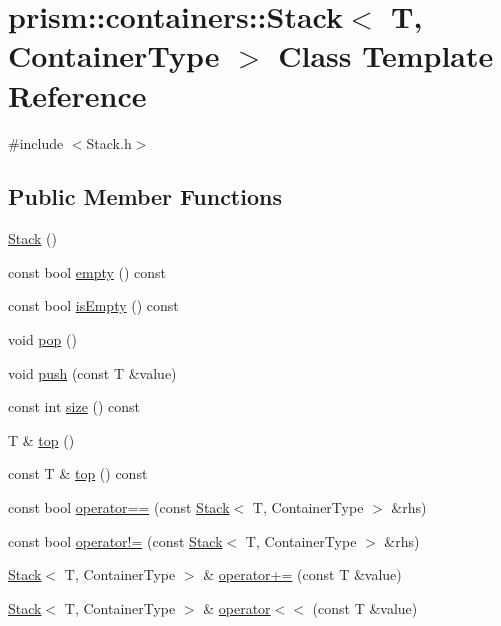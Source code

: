 \hypertarget{classprism_1_1containers_1_1_stack}{}\section{prism\+:\+:containers\+:\+:Stack$<$ T, Container\+Type $>$ Class Template Reference}
\label{classprism_1_1containers_1_1_stack}


{\ttfamily \#include $<$Stack.\+h$>$}

\subsection*{Public Member Functions}
\begin{DoxyCompactItemize}
\item 
\hyperlink{classprism_1_1containers_1_1_stack_a4043720d923c57d4efc3581e5a8043df}{Stack} ()
\item 
const bool \hyperlink{classprism_1_1containers_1_1_stack_af2f1920726e21c2c14b41808767887d6}{empty} () const 
\item 
const bool \hyperlink{classprism_1_1containers_1_1_stack_acace29ab16f14720c32839f619280db8}{is\+Empty} () const 
\item 
void \hyperlink{classprism_1_1containers_1_1_stack_a09a12e102d230781566aeec2102d4e84}{pop} ()
\item 
void \hyperlink{classprism_1_1containers_1_1_stack_aaf036034d96dd2c287cd81125c33b68f}{push} (const T \&value)
\item 
const int \hyperlink{classprism_1_1containers_1_1_stack_acc76a9972dc69ec8a9929e39bd81d1e2}{size} () const 
\item 
T \& \hyperlink{classprism_1_1containers_1_1_stack_a633615dbbafc1f89b75e916c26cb3550}{top} ()
\item 
const T \& \hyperlink{classprism_1_1containers_1_1_stack_ac5611e10a04cfbb4e50b7d1db01c012f}{top} () const 
\item 
const bool \hyperlink{classprism_1_1containers_1_1_stack_aa6df6ae35e5793021618e43d45ce2927}{operator==} (const \hyperlink{classprism_1_1containers_1_1_stack}{Stack}$<$ T, Container\+Type $>$ \&rhs)
\item 
const bool \hyperlink{classprism_1_1containers_1_1_stack_a695f835109a49dc0fd2a87385bc6b53b}{operator!=} (const \hyperlink{classprism_1_1containers_1_1_stack}{Stack}$<$ T, Container\+Type $>$ \&rhs)
\item 
\hyperlink{classprism_1_1containers_1_1_stack}{Stack}$<$ T, Container\+Type $>$ \& \hyperlink{classprism_1_1containers_1_1_stack_a7d14262920e4b20435a270daf7fb1b8c}{operator+=} (const T \&value)
\item 
\hyperlink{classprism_1_1containers_1_1_stack}{Stack}$<$ T, Container\+Type $>$ \& \hyperlink{classprism_1_1containers_1_1_stack_a28fc9d291fab9c2bdeacd1832ab6d94c}{operator$<$$<$} (const T \&value)
\end{DoxyCompactItemize}



